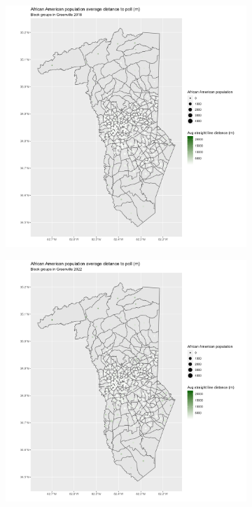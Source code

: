 \documentclass[11pt]{article}
\theoremstyle{remark}
\theoremstyle{definition}
\begin{document}
\begin{figure}
	\begin{subfigure}{.5\textwidth}
		\centering
		\includegraphics[width=\linewidth]{result_analysis/Greenville_County_SC_original_configs/black_pop_and_dist_Greenville_config_original_2018_polls.png}
		\label{sfig:York_2018_bg_dist_pop}
	\end{subfigure}
	\begin{subfigure}{.5\textwidth}
		\centering
		\includegraphics[width=\linewidth]{result_analysis/Greenville_County_SC_original_configs/black_pop_and_dist_Greenville_config_original_2022_polls.png}

\end{subfigure}
\end{figure}
\end{document}
